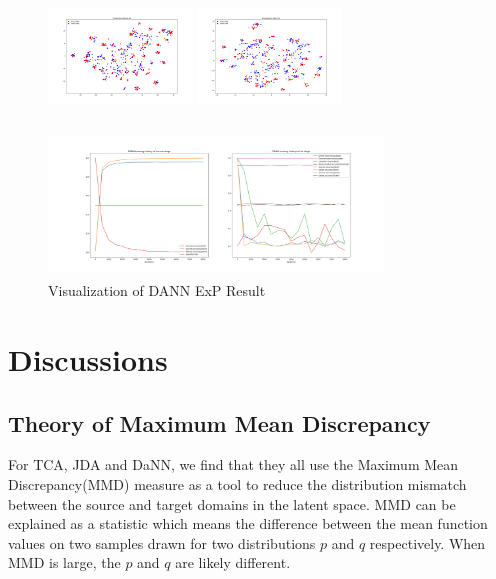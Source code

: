 \documentclass[conference]{IEEEtran}
\begin{document}
\begin{figure}[htb]
\centering
\begin{minipage}[t]{0.2\textwidth}
\includegraphics[width=1.5in, height=1.5in]{Ldann/std_P2R/before.png}
\end{minipage}%
\begin{minipage}[t]{0.2\textwidth}
\includegraphics[width=1.5in, height=1.5in]{Ldann/std_P2R/after.png}
\end{minipage}%
\begin{minipage}[t]{0.45\textwidth}
\includegraphics[width=3.5in, height=1.5in]{Ldann/std_P2R/dann.png}
\end{minipage}%
\caption{Visualization of DANN ExP Result}\label{fig:ExP2}
\end{figure}

\section{Discussions}
\subsection{Theory of Maximum Mean Discrepancy}
For TCA, JDA and DaNN, we find that they all use the Maximum Mean Discrepancy(MMD) measure as a tool to reduce the distribution mismatch between the source and target domains in the latent space. MMD can be explained as a statistic which means the difference between the mean function values on two samples drawn for two distributions $p$ and $q$ respectively. When MMD is large, the $p$ and $q$ are likely different.
\end{document}
